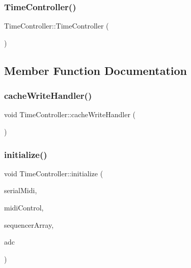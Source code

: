 \subsubsection{\texorpdfstring{Time\+Controller()}{TimeController()}}
{\footnotesize\ttfamily Time\+Controller\+::\+Time\+Controller (\begin{DoxyParamCaption}{ }\end{DoxyParamCaption})}



\subsection{Member Function Documentation}
\mbox{\label{class_time_controller_af64bff39f4e51f75963ae6df9e374881}} 
\subsubsection{\texorpdfstring{cache\+Write\+Handler()}{cacheWriteHandler()}}
{\footnotesize\ttfamily void Time\+Controller\+::cache\+Write\+Handler (\begin{DoxyParamCaption}{ }\end{DoxyParamCaption})}

\mbox{\label{class_time_controller_ae819298bde61b72b67b067b690032280}} 
\subsubsection{\texorpdfstring{initialize()}{initialize()}}
{\footnotesize\ttfamily void Time\+Controller\+::initialize (\begin{DoxyParamCaption}\item[{midi\+::\+Midi\+Interface$<$ Hardware\+Serial $>$ $\ast$}]{serial\+Midi,  }\item[{\hyperlink{class_midi_module}{Midi\+Module} $\ast$}]{midi\+Control,  }\item[{Sequencer $\ast$}]{sequencer\+Array,  }\item[{A\+DC $\ast$}]{adc }\end{DoxyParamCaption})}

